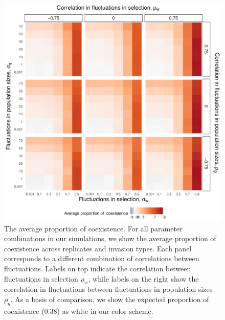 \documentclass[12pt]{article}
\begin{document}
\begin{figure}[H]
  \centerline{\includegraphics[width=1\textwidth]{heat_map.pdf}}
  \caption{The average proportion of coexistence.  For all parameter combinations in our simulations,  we show the average proportion of coexistence across replicates and invasion types. Each panel corresponds to a different combination of correlations between fluctuations. Labels on top indicate the correlation between fluctuations in selection $\rho_{w}$, while labels on the right show the correlation in fluctuations between fluctuations in population sizes $\rho_{g}$.  As a basis of comparison, we show the expected proportion of coexistence ($ 0.38$) as white in our color scheme.  }
    \label{fig:heatmap}
\end{figure}


\clearpage
\end{document}
